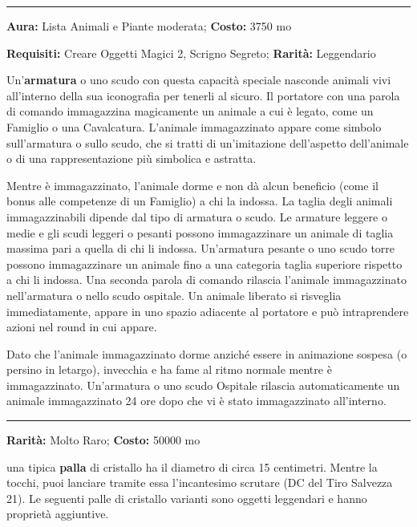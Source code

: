 \begin{multicols}{2}
\smallskip\noindent\rule{\linewidth}{2pt}  \hypertarget{Ospitale}{}\medskip{}\noindent\label{Ospitale}

\textbf{Aura:} Lista Animali e Piante moderata; \textbf{Costo:} 3750 mo

\textbf{Requisiti:} Creare Oggetti Magici 2, Scrigno Segreto; \textbf{Rarità:} Leggendario

Un'\textbf{armatura} o uno scudo con questa capacità speciale nasconde animali vivi all'interno della sua iconografia per tenerli al sicuro. Il portatore con una parola di comando immagazzina magicamente un animale a cui è legato, come un Famiglio o una Cavalcatura. L'animale immagazzinato appare come simbolo sull'armatura o sullo scudo, che si tratti di un'imitazione dell'aspetto dell'animale o di una rappresentazione più simbolica e astratta.

Mentre è immagazzinato, l'animale dorme e non dà alcun beneficio (come il bonus alle competenze di un Famiglio) a chi la indossa. La taglia degli animali immagazzinabili dipende dal tipo di armatura o scudo. Le armature leggere o medie e gli scudi leggeri o pesanti possono immagazzinare un animale di taglia massima pari a quella di chi li indossa. Un'armatura pesante o uno scudo torre possono immagazzinare un animale fino a una categoria taglia superiore rispetto a chi li indossa. Una seconda parola di comando rilascia l'animale immagazzinato nell'armatura o nello scudo ospitale. Un animale liberato si risveglia immediatamente, appare in uno spazio adiacente al portatore e può intraprendere azioni nel round in cui appare.

Dato che l'animale immagazzinato dorme anziché essere in animazione sospesa (o persino in letargo), invecchia e ha fame al ritmo normale mentre è immagazzinato. Un'armatura o uno scudo Ospitale rilascia automaticamente un animale immagazzinato 24 ore dopo che vi è stato immagazzinato all'interno.

\smallskip\noindent\rule{\linewidth}{2pt}  \hypertarget{PalladiCristallo}{}\medskip{}\noindent\label{PalladiCristallo}

\textbf{Rarità:} Molto Raro; \textbf{Costo:} 50000 mo

una tipica \textbf{palla} di cristallo ha il diametro di circa 15 centimetri. Mentre la tocchi, puoi lanciare tramite essa l'incantesimo scrutare (DC del Tiro Salvezza 21). Le seguenti palle di cristallo varianti sono oggetti leggendari e hanno proprietà aggiuntive.


\end{multicols}
